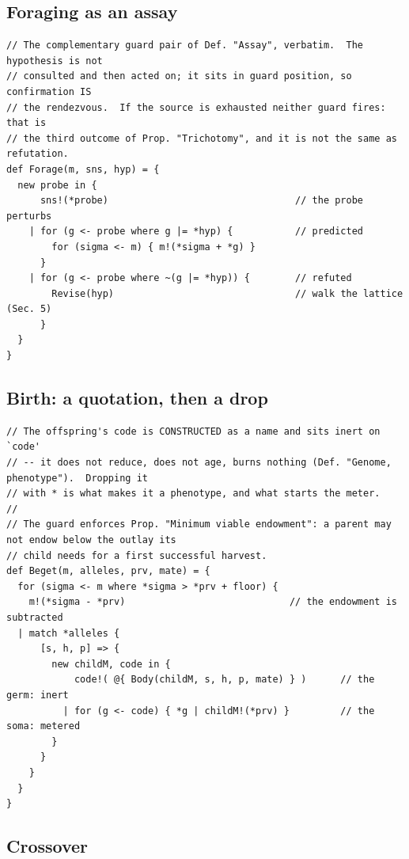 \subsection{Foraging as an assay}\label{sci:S19.3}

\begin{lstlisting}
// The complementary guard pair of Def. "Assay", verbatim.  The hypothesis is not
// consulted and then acted on; it sits in guard position, so confirmation IS
// the rendezvous.  If the source is exhausted neither guard fires: that is
// the third outcome of Prop. "Trichotomy", and it is not the same as refutation.
def Forage(m, sns, hyp) = {
  new probe in {
      sns!(*probe)                                 // the probe perturbs
    | for (g <- probe where g |= *hyp) {           // predicted
        for (sigma <- m) { m!(*sigma + *g) }
      }
    | for (g <- probe where ~(g |= *hyp)) {        // refuted
        Revise(hyp)                                // walk the lattice (Sec. 5)
      }
  }
}
\end{lstlisting}

\subsection{Birth: a quotation, then a drop}\label{sci:S19.4}

\begin{lstlisting}
// The offspring's code is CONSTRUCTED as a name and sits inert on `code'
// -- it does not reduce, does not age, burns nothing (Def. "Genome, phenotype").  Dropping it
// with * is what makes it a phenotype, and what starts the meter.
//
// The guard enforces Prop. "Minimum viable endowment": a parent may not endow below the outlay its
// child needs for a first successful harvest.
def Beget(m, alleles, prv, mate) = {
  for (sigma <- m where *sigma > *prv + floor) {
    m!(*sigma - *prv)                             // the endowment is subtracted
  | match *alleles {
      [s, h, p] => {
        new childM, code in {
            code!( @{ Body(childM, s, h, p, mate) } )      // the germ: inert
          | for (g <- code) { *g | childM!(*prv) }         // the soma: metered
        }
      }
    }
  }
}
\end{lstlisting}

\subsection{Crossover}\label{sci:S19.5}

